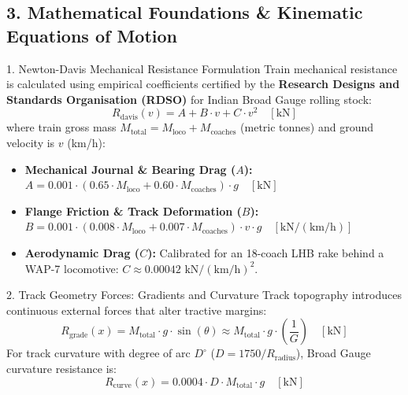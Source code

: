 \documentclass[10pt, a4paper]{article}
\begin{document}
\subsection*{3. Mathematical Foundations \& Kinematic Equations of Motion}

\begin{mathbox}{1. Newton-Davis Mechanical Resistance Formulation}
  Train mechanical resistance is calculated using empirical coefficients certified by the \textbf{Research Designs and Standards Organisation (RDSO)} for Indian Broad Gauge rolling stock:
  \begin{equation}
    R_{\text{davis}}(v) = A + B \cdot v + C \cdot v^2 \quad [\text{kN}]
  \end{equation}
  where train gross mass $M_{\text{total}} = M_{\text{loco}} + M_{\text{coaches}}$ (metric tonnes) and ground velocity is $v$ (km/h):
  \begin{itemize}[leftmargin=4mm, itemsep=1pt]
    \item \textbf{Mechanical Journal \& Bearing Drag ($A$):} $A = 0.001 \cdot (0.65 \cdot M_{\text{loco}} + 0.60 \cdot M_{\text{coaches}}) \cdot g \quad [\text{kN}]$
    \item \textbf{Flange Friction \& Track Deformation ($B$):} $B = 0.001 \cdot (0.008 \cdot M_{\text{loco}} + 0.007 \cdot M_{\text{coaches}}) \cdot v \cdot g \quad [\text{kN}/(\text{km/h})]$
    \item \textbf{Aerodynamic Drag ($C$):} Calibrated for an 18-coach LHB rake behind a WAP-7 locomotive: $C \approx 0.00042\text{ kN}/(\text{km/h})^2$.
  \end{itemize}
\end{mathbox}

\begin{mathbox}{2. Track Geometry Forces: Gradients and Curvature}
  Track topography introduces continuous external forces that alter tractive margins:
  \begin{equation}
    R_{\text{grade}}(x) = M_{\text{total}} \cdot g \cdot \sin(\theta) \approx M_{\text{total}} \cdot g \cdot \left(\frac{1}{G}\right) \quad [\text{kN}]
  \end{equation}
  For track curvature with degree of arc $D^\circ$ ($D = 1750 / R_{\text{radius}}$), Broad Gauge curvature resistance is:
  \begin{equation}
    R_{\text{curve}}(x) = 0.0004 \cdot D \cdot M_{\text{total}} \cdot g \quad [\text{kN}]
  \end{equation}
\end{mathbox}
\end{document}
